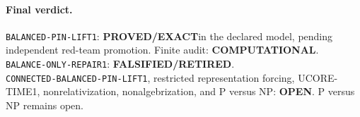\documentclass[11pt]{article}
\newcommand{\EXACT}{\textbf{PROVED/EXACT}}
\newcommand{\OPEN}{\textbf{OPEN}}
\newcommand{\RETIRED}{\textbf{FALSIFIED/RETIRED}}
\newcommand{\COMP}{\textbf{COMPUTATIONAL}}
\begin{document}
\paragraph{Final verdict.}
\texttt{BALANCED-PIN-LIFT1}: \EXACT in the declared model, pending
independent red-team promotion.  Finite audit: \COMP.\\
\texttt{BALANCE-ONLY-REPAIR1}: \RETIRED.\\
\texttt{CONNECTED-BALANCED-PIN-LIFT1}, restricted representation forcing,
UCORE-TIME1, nonrelativization, nonalgebrization, and P versus NP: \OPEN.
P versus NP remains open.

\end{document}
